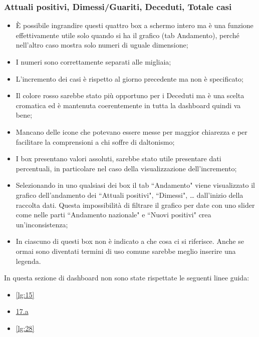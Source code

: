 \subsubsection{Attuali positivi, Dimessi/Guariti, Deceduti, Totale casi}
\label{sss:attuali_positivi-dimessi_guariti-deceduti-totale_casi}
\begin{itemize}
    \item \`E possibile ingrandire questi quattro box a schermo intero ma è una funzione effettivamente utile solo quando si ha il grafico (tab Andamento), perché nell'altro caso mostra solo numeri di uguale dimensione;
    \item I numeri sono correttamente separati alle migliaia;
    \item L'incremento dei casi è rispetto al giorno precedente ma non è specificato;
    \item Il colore rosso sarebbe stato più opportuno per i Deceduti ma è una scelta cromatica ed è mantenuta coerentemente in tutta la dashboard quindi va bene;
    \item Mancano delle icone che potevano essere messe per maggior chiarezza e per facilitare la comprensioni a chi soffre di daltonismo;
    \item I box presentano valori assoluti, sarebbe stato utile presentare dati percentuali, in particolare nel caso della visualizzazione dell'incremento;
    \item Selezionando in uno qualsiasi dei box il tab ``Andamento" viene visualizzato il grafico dell'andamento dei ``Attuali positivi", ``Dimessi", … dall'inizio della raccolta dati. Questa impossibilità di filtrare il grafico per date con uno slider come nelle parti ``Andamento nazionale" e ``Nuovi positivi" crea un'inconsistenza;
    \item In ciascuno di questi box non è indicato a che cosa ci si riferisce. Anche se ormai sono diventati termini di uso comune sarebbe meglio inserire una legenda.
\end{itemize}
In questa sezione di dashboard non sono state rispettate le seguenti linee guida:
\begin{itemize}
    \item \ref{lg:15}
    \item \hyperref[lg:17.a]{17.a}
    \item \ref{lg:28}
\end{itemize}

